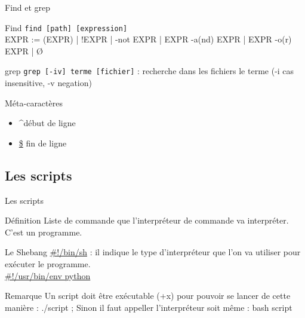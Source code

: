 \begin{frame}{Find et grep}
\begin{block}{Find}
\texttt{find [path] [expression]}\\
EXPR := (EXPR) | !EXPR | -not EXPR | EXPR -a(nd) EXPR | EXPR -o(r) EXPR | Ø\\

\end{block}

\begin{block}{grep}
\texttt{grep [-iv] terme [fichier]} : recherche dans les fichiers le terme (-i cas insensitive, -v negation)
\end{block}

\begin{alertblock}{Méta-caractères}
\begin{itemize}
\item \textasciicircum début de ligne
\item \url{$} fin de ligne
\end{itemize}
\end{alertblock}
\end{frame}

\subsection{Les scripts}
\begin{frame}{Les scripts}
\begin{block}{Définition}
Liste de commande que l'interpréteur de commande va interpréter. C'est un programme.
\end{block}

\begin{block}{Le Shebang}
\url{\#!/bin/sh} : il indique le type d'interpréteur que l'on va utiliser pour exécuter le programme.\\
\url{\#!/usr/bin/env python}
\end{block}

\begin{alertblock}{Remarque}
Un script doit être exécutable (+x) pour pouvoir se lancer de cette manière : ./script ; Sinon il faut appeller l'interpréteur soit même : bash script
\end{alertblock}
\end{frame}

